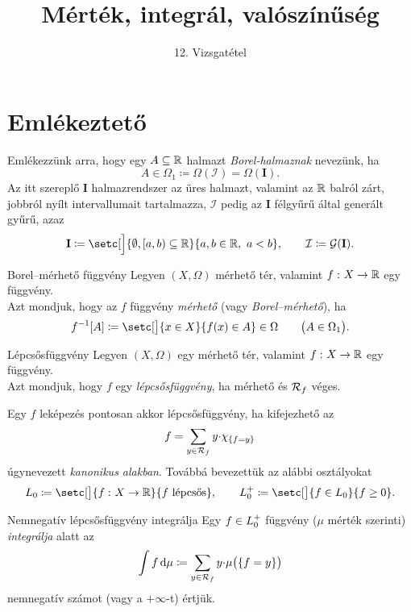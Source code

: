 \documentclass[
]{elteikthesis}[2024/04/26]
\title{Mérték, integrál, valószínűség} %
\subtitle{12. Vizsgatétel}
\begin{document}
	
	
	\section{Emlékeztető}
	
	Emlékezzünk arra, hogy egy \( A \subseteq \mathbb{R} \) halmazt \emph{Borel-halmaznak} nevezünk, ha
	\[
		A \in \Omega_1 \coloneq \Omega( \mathcal{I} ) = \Omega( \mathbf{I} ).
	\]
	Az itt szereplő \( \mathbf{I} \) halmazrendszer az üres halmazt, 
	valamint az \( \mathbb{R} \) balról zárt, jobbról nyílt intervallumait tartalmazza,
	\( \mathcal{I} \) pedig az \( \mathbf{I} \) félgyűrű által generált gyűrű, azaz
	\[
		\mathbf{I} \coloneq 
		\setc[\Big]{ \emptyset, [a, b) \subseteq \R }{ a, b \in \R, \ a < b }, \qquad
		\mathcal{I} \coloneq
		\mathcal{G}( \mathbf{I} ).
	\]
	\begin{definition}{Borel--mérhető függvény}{}	
		Legyen \( (X, \Omega) \) mérhető tér, valamint \( f \,\colon X \to \mathbb{R} \) egy függvény.\\[3pt]
		Azt mondjuk, hogy az \( f \) függvény \emph{mérhető} (vagy \emph{Borel--mérhető}), ha
		\[
		f^{-1}[A] \coloneq
		\setc[\big]{ x \in X }{ f(x) \in A } \in \Omega
		\qquad \bigl( A \in \Omega_1 \bigr).
		\]
	\end{definition}
	
	\begin{definition}{Lépcsősfüggvény}{}
		Legyen \( (X, \Omega) \) egy mérhető tér, valamint \( f \,\colon X \to \mathbb{R} \) egy függvény.\\[3pt]
		Azt mondjuk, hogy \( f \) egy \emph{lépcsősfüggvény}, 
		ha mérhető és \( \mathcal{R}_{f} \) véges.
	\end{definition}
	
	Egy \( f \) leképezés pontosan akkor lépcsősfüggvény, ha kifejezhető az
	\[
		f = \sum_{y \in \mathcal{R}_{f}} y {\cdot} \chi_{\{ f = y \}}
	\]
	úgynevezett \emph{kanonikus alakban}. Továbbá bevezettük az alábbi osztályokat
	\[
		\StepFunc \coloneq \setc[\big]{ \func{f}{X}{\R} }{ f \text{ lépcsős}}, \qquad
		\StepFuncPlus \coloneq \setc[\big]{ f \in \StepFunc }{ f \geq 0 }. 
	\]
	
	\begin{definition}{Nemnegatív lépcsősfüggvény integrálja}{}
		Egy \( f \in \StepFuncPlus \) függvény (\( \mu \) mérték szerinti) \emph{integrálja} alatt az
		\[
		\int f \mathop{}\!\mathrm{d}{\mu} \coloneq
		\sum_{y \in \mathcal{R}_{f}} y {\cdot} \mu \bigl( \{ f = y \} \bigr)
		\]
		nemnegatív számot (vagy a \( +\infty \)-t) értjük.
	\end{definition}
	
\end{document}
